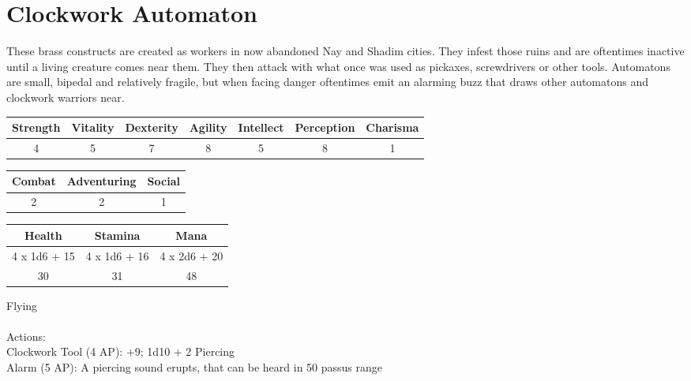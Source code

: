 \pagebreak
\section{Clockwork Automaton}

These brass constructs are created as workers in now abandoned Nay and Shadim cities. They infest those ruins and are oftentimes inactive until a living creature comes near them. They then attack with what once was used as pickaxes, screwdrivers or other tools.
Automatons are small, bipedal and relatively fragile, but when facing danger oftentimes emit an alarming buzz that draws other automatons and clockwork warriors near.\\

\begin{minipage}[H]{1\textwidth}
	\centering
	\begin{tabular}[c]{|c | c | c | c | c | c | c|}
		\hline
		Strength & Vitality & Dexterity & Agility & Intellect & Perception & Charisma\\
		\hline
		4 & 5 & 7 & 8 & 5 & 8 & 1\\
		\hline
	\end{tabular}
\end{minipage}
\bigbreak
\begin{minipage}[H]{1\textwidth}
	\centering
	\begin{tabular}[c]{|c | c | c|}
		\hline
		Combat & Adventuring & Social\\
		\hline
		2 & 2 & 1\\
		\hline
	\end{tabular}
\end{minipage}
\bigbreak
\begin{minipage}[H]{1\textwidth}
	\centering
	\begin{tabular}[c]{|c | c | c|}
		\hline
		Health & Stamina & Mana\\
		\hline
		4 x 1d6 + 15 & 4 x 1d6 + 16 & 4 x 2d6 + 20\\
		30 & 31 & 48\\
		\hline
	\end{tabular}
\end{minipage}
\noindent
Flying\\
\\
Actions:\\
Clockwork Tool (4 AP): +9; 1d10 + 2 Piercing\\
Alarm (5 AP): A piercing sound erupts, that can be heard in 50 passus range\\
